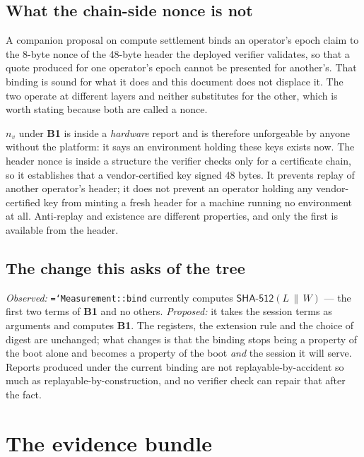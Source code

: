 \documentclass[11pt,a4paper]{article}
\newcommand{\code}[1]{\texttt{\hyphenchar\font=`\-\relax #1}}
\newcommand{\req}[1]{\textbf{#1}}
\begin{document}
\subsection{What the chain-side nonce is not}
\label{sec:twononces}

A companion proposal on compute settlement \cite{hipsettle} binds an operator's
epoch claim to the 8-byte nonce of the 48-byte header the deployed verifier
validates, so that a quote produced for one operator's epoch cannot be presented
for another's. That binding is sound for what it does and this document does not
displace it. The two operate at different layers and neither substitutes for the
other, which is worth stating because both are called a nonce.

$n_v$ under \req{B1} is inside a \emph{hardware} report and is therefore
unforgeable by anyone without the platform: it says an environment holding these
keys exists now. The header nonce is inside a structure the verifier checks only
for a certificate chain, so it establishes that a vendor-certified key signed 48
bytes. It prevents replay of another operator's header; it does not prevent an
operator holding any vendor-certified key from minting a fresh header for a
machine running no environment at all. Anti-replay and existence are different
properties, and only the first is available from the header.

\subsection{The change this asks of the tree}

\emph{Observed:} \code{Measurement::bind} currently computes
$\mathsf{SHA\text{-}512}(L \,\|\, W)$ --- the first two terms of \req{B1} and no
others. \emph{Proposed:} it takes the session terms as arguments and computes
\req{B1}. The registers, the extension rule and the choice of digest are unchanged;
what changes is that the binding stops being a property of the boot alone and
becomes a property of the boot \emph{and} the session it will serve. Reports
produced under the current binding are not replayable-by-accident so much as
replayable-by-construction, and no verifier check can repair that after the fact.

\section{The evidence bundle}
\label{sec:bundle}
\end{document}
